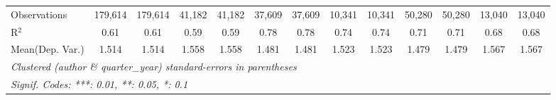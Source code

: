 \begin{tabular}{lcccccccccccc}
   Observations                             & 179,614        & 179,614     & 41,182  & 41,182  & 37,609         & 37,609         & 10,341       & 10,341       & 50,280  & 50,280        & 13,040  & 13,040\\  
   R$^2$                                    & 0.61           & 0.61        & 0.59    & 0.59    & 0.78           & 0.78           & 0.74         & 0.74         & 0.71    & 0.71          & 0.68    & 0.68\\  
Mean(Dep. Var.) & 1.514 & 1.514 & 1.558 & 1.558 & 1.481 & 1.481 & 1.523 & 1.523 & 1.479 & 1.479 & 1.567 & 1.567 \\
   \midrule \midrule
   \multicolumn{13}{l}{\emph{Clustered (author \& quarter\_year) standard-errors in parentheses}}\\
   \multicolumn{13}{l}{\emph{Signif. Codes: ***: 0.01, **: 0.05, *: 0.1}}\\
\end{tabular}
\par\endgroup
